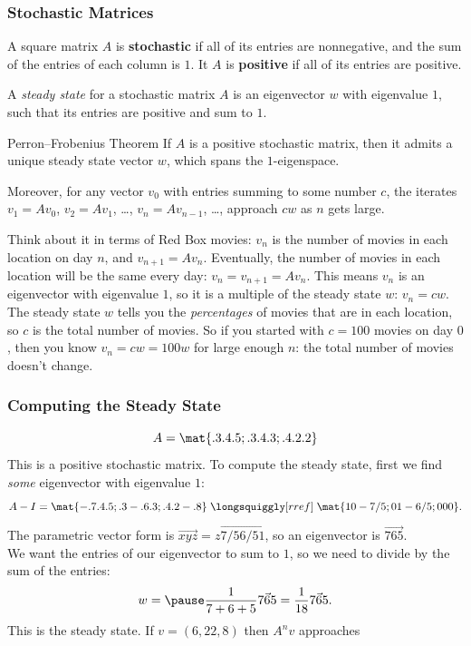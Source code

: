 
\begin{frame}
\frametitle{Stochastic Matrices}

\vskip-3mm
\begin{defn}
  A square matrix $A$ is \textbf{stochastic} if all of its entries are
  nonnegative, and the sum of the entries of each column is $1$.
  It $A$ is \textbf{positive} if all of its entries are positive.
\end{defn}

\pause
\begin{defn}
  A \emph{steady state} for a stochastic matrix $A$ is an eigenvector $w$ with
  eigenvalue $1$, such that its entries are positive and sum to $1$.
\end{defn}

\pause
\begin{oneoffthm}{Perron--Frobenius Theorem}
  If $A$ is a positive stochastic matrix, then it admits a unique steady state
  vector $w$, which spans the $1$-eigenspace.

  \smallskip
  Moreover, for any vector $v_0$ with entries summing to some number
  $c$, the iterates $v_1 = Av_0$, $v_2 = Av_1$, \ldots, $v_n = Av_{n-1}$,
  \ldots, approach $cw$ as $n$ gets large.
\end{oneoffthm}

\pause\medskip\small
Think about it in terms of Red Box movies:
\pause
$v_n$ is the number of movies in each location on day $n$, and $v_{n+1}=Av_n$.
\pause
Eventually, the number of movies in each location will be the same every day:
$v_n = v_{n+1} = Av_n$.
\pause
This means $v_n$ is an eigenvector with eigenvalue $1$, so it is a multiple of
the steady state $w$: $v_n = cw$.
\pause
The steady state $w$ tells you the \emph{percentages} of movies that are in each
location, so $c$ is the total number of movies.
\pause
So if you started with $c=100$ movies on day $0$, then you know
$v_n = cw = 100w$ for large enough $n$: the total number of movies doesn't
change.

\end{frame}



\begin{frame}
\frametitle{Computing the Steady State}

\vskip-3mm
\[ A = \mat{.3 .4 .5; .3 .4 .3; .4 .2 .2} \]
This is a positive stochastic matrix.
\pause
To compute the steady state, first we find \emph{some} eigenvector with
eigenvalue $1$:
\[ A - I = \mat{-.7 .4 .5; .3 -.6 .3; .4 .2 -.8}
\;\longsquiggly[rref]\;
\mat{1 0 -7/5; 0 1 -6/5; 0 0 0}.
\]
\pause
The parametric vector form is $\vec{x y z} = z\vec{7/5 6/5 1}$, so an
eigenvector is $\vec{7 6 5}$.
\pause\\[1mm]
We want the entries of our eigenvector to sum to $1$, so we need to divide by
the sum of the entries:
\[ w = \pause \frac 1{7+6+5}\vec{7 6 5} = \frac 1{18}\vec{7 6 5}. \]
\pause
This is the steady state.
\pause
If $v = (6,22,8)$ then $A^nv$ approaches
\pause
{}

\end{frame}


